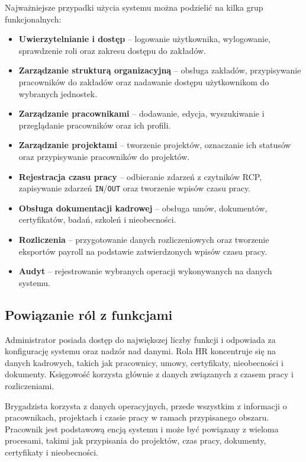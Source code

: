 Najważniejsze przypadki użycia systemu można podzielić na kilka grup funkcjonalnych:
\begin{itemize}
    \item \textbf{Uwierzytelnianie i dostęp} -- logowanie użytkownika, wylogowanie, sprawdzenie roli oraz zakresu dostępu do zakładów.
    \item \textbf{Zarządzanie strukturą organizacyjną} -- obsługa zakładów, przypisywanie pracowników do zakładów oraz nadawanie dostępu użytkownikom do wybranych jednostek.
    \item \textbf{Zarządzanie pracownikami} -- dodawanie, edycja, wyszukiwanie i przeglądanie pracowników oraz ich profili.
    \item \textbf{Zarządzanie projektami} -- tworzenie projektów, oznaczanie ich statusów oraz przypisywanie pracowników do projektów.
    \item \textbf{Rejestracja czasu pracy} -- odbieranie zdarzeń z czytników RCP, zapisywanie zdarzeń \texttt{IN}/\texttt{OUT} oraz tworzenie wpisów czasu pracy.
    \item \textbf{Obsługa dokumentacji kadrowej} -- obsługa umów, dokumentów, certyfikatów, badań, szkoleń i nieobecności.
    \item \textbf{Rozliczenia} -- przygotowanie danych rozliczeniowych oraz tworzenie eksportów payroll na podstawie zatwierdzonych wpisów czasu pracy.
    \item \textbf{Audyt} -- rejestrowanie wybranych operacji wykonywanych na danych systemu.
\end{itemize}

\subsection{Powiązanie ról z funkcjami}

Administrator posiada dostęp do największej liczby funkcji i odpowiada za konfigurację systemu oraz nadzór nad danymi. Rola HR koncentruje się na danych kadrowych, takich jak pracownicy, umowy, certyfikaty, nieobecności i dokumenty. Księgowość korzysta głównie z danych związanych z czasem pracy i rozliczeniami.

Brygadzista korzysta z danych operacyjnych, przede wszystkim z informacji o pracownikach, projektach i czasie pracy w ramach przypisanego obszaru. Pracownik jest podstawową encją systemu i może być powiązany z wieloma procesami, takimi jak przypisania do projektów, czas pracy, dokumenty, certyfikaty i nieobecności.

